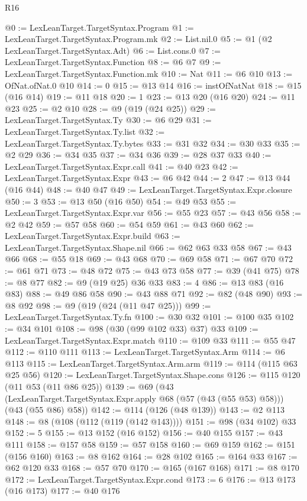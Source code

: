 \begin{lexlean}{R16}
\begin{coremodule}
@0 := LexLeanTarget.TargetSyntax.Program
@1 := LexLeanTarget.TargetSyntax.Program.mk
@2 := List.nil.{0}
@5 := @1 (@2 LexLeanTarget.TargetSyntax.Adt)
@6 := List.cons.{0}
@7 := LexLeanTarget.TargetSyntax.Function
@8 := @6 @7
@9 := LexLeanTarget.TargetSyntax.Function.mk
@10 := Nat
@11 := @6 @10
@13 := OfNat.ofNat.{0} @10
@14 := 0
@15 := @13 @14
@16 := instOfNatNat
@18 := @15 (@16 @14)
@19 := @11 @18
@20 := 1
@23 := @13 @20 (@16 @20)
@24 := @11 @23
@25 := @2 @10
@28 := @9 (@19 (@24 @25))
@29 := LexLeanTarget.TargetSyntax.Ty
@30 := @6 @29
@31 := LexLeanTarget.TargetSyntax.Ty.list
@32 := LexLeanTarget.TargetSyntax.Ty.bytes
@33 := @31 @32
@34 := @30 @33
@35 := @2 @29
@36 := @34 @35
@37 := @34 @36
@39 := @28 @37 @33
@40 := LexLeanTarget.TargetSyntax.Expr.call
@41 := @40 @23
@42 := LexLeanTarget.TargetSyntax.Expr
@43 := @6 @42
@44 := 2
@47 := @13 @44 (@16 @44)
@48 := @40 @47
@49 := LexLeanTarget.TargetSyntax.Expr.closure
@50 := 3
@53 := @13 @50 (@16 @50)
@54 := @49 @53
@55 := LexLeanTarget.TargetSyntax.Expr.var
@56 := @55 @23
@57 := @43 @56
@58 := @2 @42
@59 := @57 @58
@60 := @54 @59
@61 := @43 @60
@62 := LexLeanTarget.TargetSyntax.Expr.build
@63 := LexLeanTarget.TargetSyntax.Shape.nil
@66 := @62 @63 @33 @58
@67 := @43 @66
@68 := @55 @18
@69 := @43 @68
@70 := @69 @58
@71 := @67 @70
@72 := @61 @71
@73 := @48 @72
@75 := @43 @73 @58
@77 := @39 (@41 @75)
@78 := @8 @77
@82 := @9 (@19 @25) @36 @33
@83 := 4
@86 := @13 @83 (@16 @83)
@88 := @49 @86 @58
@90 := @43 @88 @71
@92 := @82 (@48 @90)
@93 := @8 @92
@98 := @9 (@19 (@24 (@11 @47 @25)))
@99 := LexLeanTarget.TargetSyntax.Ty.fn
@100 := @30 @32
@101 := @100 @35
@102 := @34 @101
@108 := @98 (@30 (@99 @102 @33) @37) @33
@109 := LexLeanTarget.TargetSyntax.Expr.match
@110 := @109 @33
@111 := @55 @47
@112 := @110 @111
@113 := LexLeanTarget.TargetSyntax.Arm
@114 := @6 @113
@115 := LexLeanTarget.TargetSyntax.Arm.arm
@119 := @114 (@115 @63 @25 @56)
@120 := LexLeanTarget.TargetSyntax.Shape.cons
@126 := @115 @120 (@11 @53 (@11 @86 @25))
@139 := @69
    (@43 (LexLeanTarget.TargetSyntax.Expr.apply @68 (@57 (@43 (@55 @53) @58))) (@43 (@55 @86) @58))
@142 := @114 (@126 (@48 @139))
@143 := @2 @113
@148 := @8 (@108 (@112 (@119 (@142 @143))))
@151 := @98 (@34 @102) @33
@152 := 5
@155 := @13 @152 (@16 @152)
@156 := @40 @155
@157 := @43 @111
@158 := @157 @58
@159 := @57 @158
@160 := @69 @159
@162 := @151 (@156 @160)
@163 := @8 @162
@164 := @28 @102
@165 := @164 @33
@167 := @62 @120 @33
@168 := @57 @70
@170 := @165 (@167 @168)
@171 := @8 @170
@172 := LexLeanTarget.TargetSyntax.Expr.cond
@173 := 6
@176 := @13 @173 (@16 @173)
@177 := @40 @176

\end{coremodule}
\end{lexlean}
